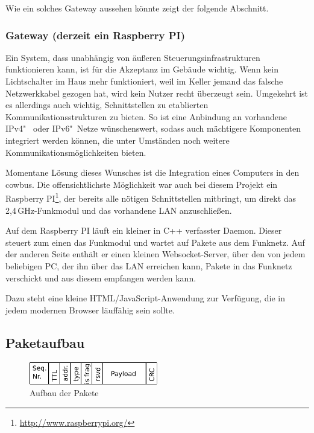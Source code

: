 \documentclass{IEEEtran}
\begin{document}
            Wie ein solches Gateway aussehen könnte zeigt der folgende Abschnitt.

        \subsubsection{Gateway (derzeit ein Raspberry PI)}
            Ein System, dass unabhängig von äußeren Steuerungsinfrastrukturen
            funktionieren kann, ist für die Akzeptanz im Gebäude wichtig.
            Wenn kein Lichtschalter im Haus mehr funktioniert, weil
            im Keller jemand das falsche Netzwerkkabel gezogen hat,
            wird kein Nutzer recht überzeugt sein.
            Umgekehrt ist es allerdings auch wichtig, Schnittstellen zu
            etablierten Kommunikationsstrukturen zu bieten.
            So ist eine Anbindung an vorhandene IPv4"~ oder IPv6"~Netze
            wünschenswert, sodass auch mächtigere Komponenten integriert werden
            können, die unter Umständen noch weitere Kommunikationsmöglichkeiten
            bieten.

            Momentane Lösung dieses Wunsches ist die Integration eines Computers
            in den cowbus. Die offensichtlichste Möglichkeit war auch bei diesem
            Projekt ein Raspberry PI\footnote{\url{http://www.raspberrypi.org/}},
            der bereits alle nötigen Schnittstellen mitbringt, um direkt das
            2,4\,GHz-Funkmodul und das vorhandene \ac{LAN} anzuschließen.

            Auf dem Raspberry PI läuft ein kleiner in C++ verfasster Daemon.
            Dieser steuert zum einen das Funkmodul und wartet auf Pakete aus
            dem Funknetz.
            Auf der anderen Seite enthält er einen kleinen Websocket-Server,
            über den von jedem beliebigen PC, der ihn über das \ac{LAN}
            erreichen kann, Pakete in das Funknetz verschickt und aus diesem
            empfangen werden kann.

            Dazu steht eine kleine HTML/JavaScript-Anwendung zur Verfügung,
            die in jedem modernen Browser läuffähig sein sollte.

    \subsection{Paketaufbau}
            \begin{figure}
            \centering
            \includegraphics[width=0.5\textwidth]{img/paket}
            \caption{Aufbau der Pakete}
            \label{fig:paket}
        \end{figure}
\end{document}
